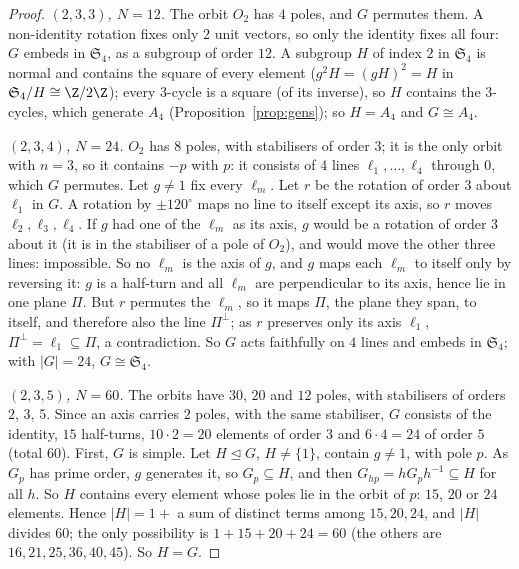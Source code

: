 \begin{proof}
\emph{$(2,3,3)$, $N=12$.} The orbit $O_2$ has $4$ poles, and $G$ permutes them. A non-identity rotation fixes only $2$ unit vectors, so only the identity fixes all four: $G$ embeds in $\mathfrak S_4$, as a subgroup of order $12$. A subgroup $H$ of index $2$ in $\mathfrak S_4$ is normal and contains the square of every element ($g^2H=(gH)^2=H$ in $\mathfrak S_4/H\cong\Z/2\Z$); every $3$-cycle is a square (of its inverse), so $H$ contains the $3$-cycles, which generate $A_4$ (Proposition~\ref{prop:gens}); so $H=A_4$ and $G\cong A_4$.

\emph{$(2,3,4)$, $N=24$.} $O_2$ has $8$ poles, with stabilisers of order $3$; it is the only orbit with $n=3$, so it contains $-p$ with $p$: it consists of $4$ lines $\ell_1,\dots,\ell_4$ through $0$, which $G$ permutes. Let $g\ne1$ fix every $\ell_m$. Let $r$ be the rotation of order $3$ about $\ell_1$ in $G$. A rotation by $\pm120^\circ$ maps no line to itself except its axis, so $r$ moves $\ell_2,\ell_3,\ell_4$. If $g$ had one of the $\ell_m$ as its axis, $g$ would be a rotation of order $3$ about it (it is in the stabiliser of a pole of $O_2$), and would move the other three lines: impossible. So no $\ell_m$ is the axis of $g$, and $g$ maps each $\ell_m$ to itself only by reversing it: $g$ is a half-turn and all $\ell_m$ are perpendicular to its axis, hence lie in one plane $\Pi$. But $r$ permutes the $\ell_m$, so it maps $\Pi$, the plane they span, to itself, and therefore also the line $\Pi^\perp$; as $r$ preserves only its axis $\ell_1$, $\Pi^\perp=\ell_1\subseteq\Pi$, a contradiction. So $G$ acts faithfully on $4$ lines and embeds in $\mathfrak S_4$; with $|G|=24$, $G\cong\mathfrak S_4$.

\emph{$(2,3,5)$, $N=60$.} The orbits have $30$, $20$ and $12$ poles, with stabilisers of orders $2$, $3$, $5$. Since an axis carries $2$ poles, with the same stabiliser, $G$ consists of the identity, $15$ half-turns, $10\cdot2=20$ elements of order $3$ and $6\cdot4=24$ of order $5$ (total $60$). First, $G$ is simple. Let $H\trianglelefteq G$, $H\ne\{1\}$, contain $g\ne1$, with pole $p$. As $G_p$ has prime order, $g$ generates it, so $G_p\subseteq H$, and then $G_{hp}=hG_ph^{-1}\subseteq H$ for all $h$. So $H$ contains every element whose poles lie in the orbit of $p$: $15$, $20$ or $24$ elements. Hence $|H|=1+$ a sum of distinct terms among $15,20,24$, and $|H|$ divides $60$; the only possibility is $1+15+20+24=60$ (the others are $16,21,25,36,40,45$). So $H=G$.


\end{proof}
